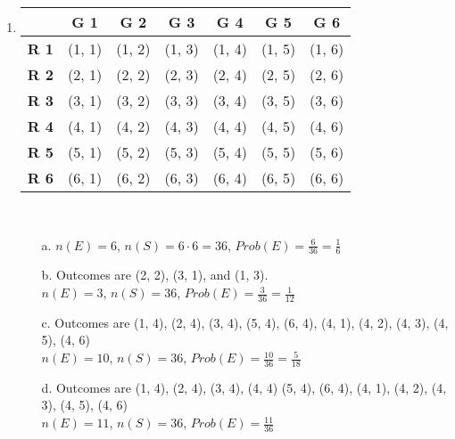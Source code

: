 {    \begin{enumerate}
        \item   
            \begin{tabular}{c | c c c c c c}
                & \textbf{G 1} & \textbf{G 2} & \textbf{G 3} & \textbf{G 4} & \textbf{G 5} & \textbf{G 6}
                \\ \hline
                \textbf{R 1}
                    & (1, 1) & (1, 2) & (1, 3) & (1, 4) & (1, 5) & (1, 6)
                \\
                \textbf{R 2}
                    & (2, 1) & (2, 2) & (2, 3) & (2, 4) & (2, 5) & (2, 6)
                \\
                \textbf{R 3}
                    & (3, 1) & (3, 2) & (3, 3) & (3, 4) & (3, 5) & (3, 6)
                \\
                \textbf{R 4}
                    & (4, 1) & (4, 2) & (4, 3) & (4, 4) & (4, 5) & (4, 6)
                \\
                \textbf{R 5}
                    & (5, 1) & (5, 2) & (5, 3) & (5, 4) & (5, 5) & (5, 6)
                \\
                \textbf{R 6}
                    & (6, 1) & (6, 2) & (6, 3) & (6, 4) & (6, 5) & (6, 6)
            \end{tabular}
            ~\\
            \begin{itemize}
                \item[a.]   $n(E) = 6$, $n(S) = 6 \cdot 6 = 36$, $Prob(E) = \frac{6}{36} = \frac{1}{6}$
                \item[b.]   Outcomes are (2, 2), (3, 1), and (1, 3). \\
                            $n(E) = 3$, $n(S) = 36$, $Prob(E) = \frac{3}{36} = \frac{1}{12}$
                \item[c.]   Outcomes are (1, 4), (2, 4), (3, 4), (5, 4), (6, 4), (4, 1), (4, 2), (4, 3), (4, 5), (4, 6) \\
                            $n(E) = 10$, $n(S) = 36$, $Prob(E) = \frac{10}{36} = \frac{5}{18}$
                \item[d.]   Outcomes are (1, 4), (2, 4), (3, 4), (4, 4) (5, 4), (6, 4), (4, 1), (4, 2), (4, 3), (4, 5), (4, 6) \\
                            $n(E) = 11$, $n(S) = 36$, $Prob(E) = \frac{11}{36}$
            \end{itemize}


\end{enumerate}}
